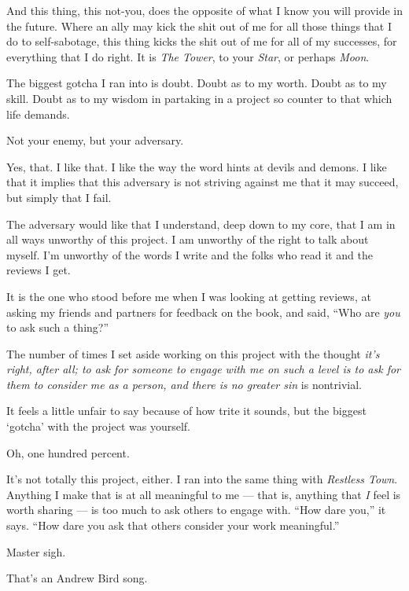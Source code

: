 \begin{paracol}{2}
\begin{rightcolumn}
  And this thing, this not-you, does the opposite of what I know you will provide in the future. Where an ally may kick the shit out of me for all those things that I do to self-sabotage, this thing kicks the shit out of me for all of my successes, for everything that I do right. It is \emph{The Tower}, to your \emph{Star}, or perhaps \emph{Moon}.

  The biggest gotcha I ran into is doubt. Doubt as to my worth. Doubt as to my skill. Doubt as to my wisdom in partaking in a project so counter to that which life demands.

  \begin{ally}
    Not your enemy, but your adversary.
  \end{ally}
  Yes, that. I like that. I like the way the word hints at devils and demons. I like that it implies that this adversary is not striving against me that it may succeed, but simply that I fail.

  The adversary would like that I understand, deep down to my core, that I am in all ways unworthy of this project. I am unworthy of the right to talk about myself. I'm unworthy of the words I write and the folks who read it and the reviews I get.

  It is the one who stood before me when I was looking at getting reviews, at asking my friends and partners for feedback on the book, and said, ``Who are \emph{you} to ask such a thing?''

  The number of times I set aside working on this project with the thought \emph{it's right, after all; to ask for someone to engage with me on such a level is to ask for them to consider me as a person, and there is no greater sin} is nontrivial.

  \begin{ally}
    It feels a little unfair to say because of how trite it sounds, but the biggest `gotcha' with the project was yourself.
  \end{ally}
  Oh, one hundred percent.

  It's not totally this project, either. I ran into the same thing with \emph{Restless Town}. Anything I make that is at all meaningful to me --- that is, anything that \emph{I} feel is worth sharing --- is too much to ask others to engage with. ``How dare you,'' it says. ``How dare you ask that others consider your work meaningful.''

  \begin{ally}
    Master sigh.
  \end{ally}
  That's an Andrew Bird song.


\end{rightcolumn}
\end{paracol}
